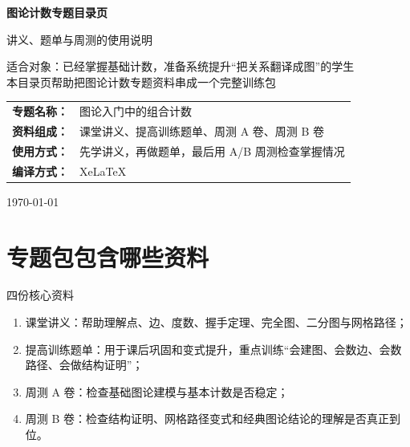 \documentclass[11pt,a4paper,fontset=fandol]{ctexart}
\begin{document}
\thispagestyle{empty}
\begin{titlepage}
\centering
\vspace*{0.9cm}

\begin{tcolorbox}[
  enhanced,
  width=0.92\textwidth,
  colback=white,
  colframe=mainblue,
  boxrule=1pt,
  arc=0mm,
  left=6mm,
  right=6mm,
  top=8mm,
  bottom=8mm
]
\centering

{\fontsize{24}{30}\selectfont\bfseries 图论计数专题目录页\par}
\vspace{0.65cm}
{\fontsize{17}{22}\selectfont 讲义、题单与周测的使用说明\par}

\vspace{1cm}
\begin{tcolorbox}[colback=lightblue,colframe=mainblue,width=0.84\textwidth,boxrule=1pt]
\centering
{\large 适合对象：已经掌握基础计数，准备系统提升“把关系翻译成图”的学生}\\[0.35em]
{\normalsize 本目录页帮助把图论计数专题资料串成一个完整训练包}
\end{tcolorbox}

\vspace{1.0cm}
\renewcommand{\arraystretch}{1.42}
\begin{tabular}{>{\bfseries}p{3.5cm}p{8cm}}
专题名称： & 图论入门中的组合计数 \\
资料组成： & 课堂讲义、提高训练题单、周测 A 卷、周测 B 卷 \\
使用方式： & 先学讲义，再做题单，最后用 A/B 周测检查掌握情况 \\
编译方式： & XeLaTeX \\
\end{tabular}

\vspace{0.9cm}
{\large \today\par}
\end{tcolorbox}
\end{titlepage}

\tableofcontents
\newpage

\section{专题包包含哪些资料}

\begin{goalbox}{四份核心资料}
\begin{enumerate}
  \item 课堂讲义：帮助理解点、边、度数、握手定理、完全图、二分图与网格路径；
  \item 提高训练题单：用于课后巩固和变式提升，重点训练“会建图、会数边、会数路径、会做结构证明”；
  \item 周测 A 卷：检查基础图论建模与基本计数是否稳定；
  \item 周测 B 卷：检查结构证明、网格路径变式和经典图论结论的理解是否真正到位。
\end{enumerate}
\end{goalbox}
\end{document}
